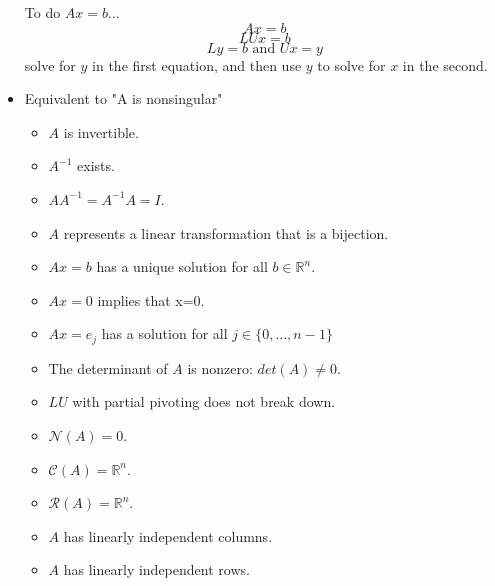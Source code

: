\documentclass[a4paper]{article}
\begin{document}
\begin{itemize}
        To do \(Ax=b\)...
        \[Ax=b\] \[LUx=b\] \[Ly=b \text{ and } Ux=y\]
        solve for \(y\) in the first equation, and then use \(y\) to solve for \(x\) in the second.
        \item Equivalent to "A is nonsingular"
            \begin{itemize}
                \item \(A\) is invertible.
                \item \(A^{-1}\) exists.
                \item \(AA^{-1}=A^{-1}A=I\).
                \item \(A\) represents a linear transformation that is a bijection.
                \item \(Ax=b\) has a unique solution for all \(b\in \mathbb{R} ^n\).
                \item \(Ax=0\) implies that x=0.
                \item \(Ax=e_j\) has a solution for all \(j\in \{0,\dots ,n-1\}\)
                \item The determinant of \(A\) is nonzero: \(det(A)\neq 0\).
                \item \(LU\) with partial pivoting does not break down.
                \item \(\mathcal{N}(A)={0}\).
                \item \(\mathcal{C}(A)=\mathbb{R}^n\).
                \item \(\mathcal{R}(A)=\mathbb{R}^n\).
                \item \(A\) has linearly independent columns.
                \item \(A\) has linearly independent rows.
            \end{itemize}
    \end{itemize}
\end{document}
